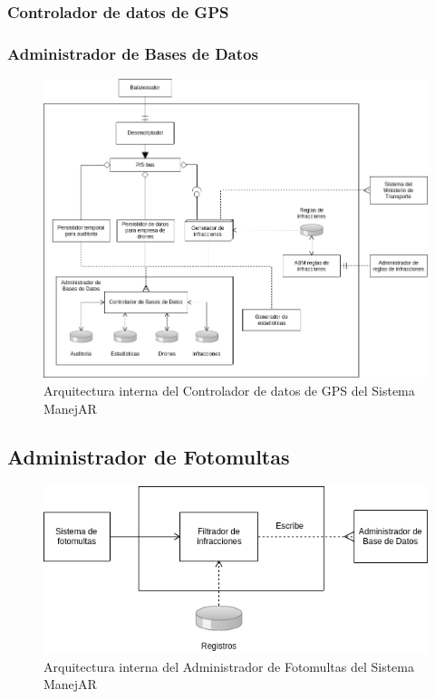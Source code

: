 \subsubsection{Controlador de datos de GPS}



\subsubsection{Administrador de Bases de Datos}



\begin{figure}
\centerline{\includegraphics[width=1\textwidth]{./imagenes/arquitectura_tp2/controlador_datos_gps.png}}
\caption{Arquitectura interna del Controlador de datos de GPS del Sistema ManejAR}
\end{figure}


\subsection{Administrador de Fotomultas}



\begin{figure}
\centerline{\includegraphics[width=1\textwidth]{./imagenes/arquitectura_tp2/administrador_fotomultas.png}}
\caption{Arquitectura interna del Administrador de Fotomultas del Sistema ManejAR}
\end{figure}


